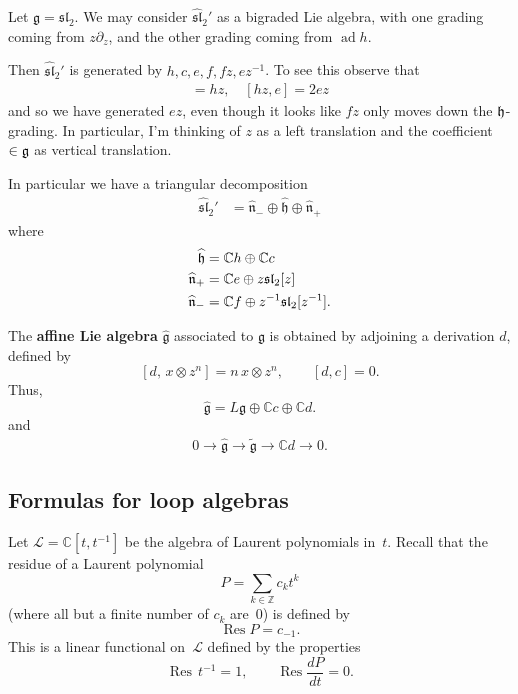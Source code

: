 \documentclass[12pt]{article}
\begin{document}
\begin{example}
    Let $\mathfrak{g} = \mathfrak{sl}_2$. We may consider $\widehat{\mathfrak{sl}}_2'$ as a bigraded Lie algebra, with one grading coming from $z\partial_z$, and the other grading coming from $\operatorname{ad} h$.

    Then $\widehat{\mathfrak{sl}}_2'$ is generated by $h, c, e, f, fz, ez^{-1}$. To see this observe that \begin{align*}
        [fz,e] = hz, \quad [hz,e] = 2ez
    \end{align*} and so we have generated $ez$, even though it looks like $fz$ only moves down the $\mathfrak{h}$-grading. In particular, I'm thinking of $z$ as a left translation and the coefficient $\in \mathfrak{g}$ as vertical translation.

    In particular we have a triangular decomposition \begin{align*}
        \widehat{\mathfrak{sl}}_2' & = \widehat{\mathfrak{n}}_- \oplus \widehat{\mathfrak{h}} \oplus \widehat{\mathfrak{n}}_+
    \end{align*} where \begin{align*}
        \widehat{\mathfrak{h}}          & = \mathbb{C}h \oplus \mathbb{C}c                    \\
        \widehat{\mathfrak{n}}_+ & = \mathbb{C}e \oplus z\mathfrak{sl}_2[z]            \\
        \widehat{\mathfrak{n}}_- & = \mathbb{C}f \oplus z^{-1}\mathfrak{sl}_2[z^{-1}].
    \end{align*}
\end{example}

\begin{definition}
    The \textbf{affine Lie algebra} $\widehat{\mathfrak{g}}$ associated to $\mathfrak{g}$ is obtained by adjoining a derivation $d$, defined by
    \[
        [d,\, x \otimes z^n] = n\,x \otimes z^n,
        \qquad [d,c]=0.
    \]
    Thus,
    \[
        \widehat{\mathfrak{g}} = L\mathfrak{g} \oplus \mathbb{C}c \oplus \mathbb{C}d.
    \] and \begin{align*}
        0 \to \widehat{\mathfrak{g}} \to \widetilde{\mathfrak{g}} \to \mathbb{C}d \to 0.
    \end{align*}
\end{definition}
\subsection{Formulas for loop algebras}
Let $\mathcal{L} = \mathbb{C}[t, t^{-1}]$ be the algebra of Laurent polynomials in~$t$.
Recall that the residue of a Laurent polynomial
\[
P = \sum_{k \in \mathbb{Z}} c_k t^k
\]
(where all but a finite number of $c_k$ are~$0$) is defined by
\[
\operatorname{Res} P = c_{-1}.
\]
This is a linear functional on~$\mathcal{L}$ defined by the properties
\[
\operatorname{Res}\, t^{-1} = 1, 
\qquad 
\operatorname{Res} \frac{dP}{dt} = 0.
\]
\end{document}
